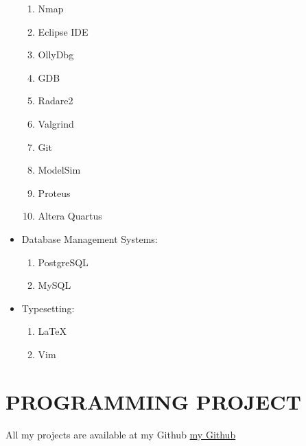\documentclass{res}
\begin{document}
\begin{resume}
\begin{itemize}
\begin{enumerate}
				\item Nmap
				\item Eclipse IDE
				\item OllyDbg
				\item GDB
				\item Radare2
				\item Valgrind
				\item Git
				\item ModelSim
				\item Proteus
				\item Altera Quartus
			\end{enumerate}
		\item Database Management Systems:
			\begin{enumerate}
				\item PostgreSQL
				\item MySQL
			\end{enumerate}
		\item Typesetting:
			\begin{enumerate}
				\item \LaTeX
				\item Vim
			\end{enumerate}
	\end{itemize}
	
	\section{PROGRAMMING PROJECT}
	All my projects are available at my Github \href{https://www.github.com/1995parham}{my Github}

\end{resume}
\end{document}
